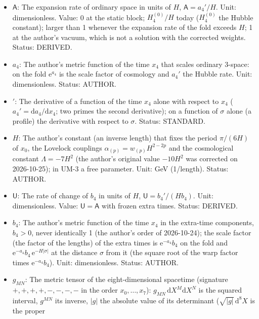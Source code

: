 \documentclass[
  10pt,
]{article}
\providecommand{\tightlist}{%
  \setlength{\itemsep}{0pt}\setlength{\parskip}{0pt}}
\begin{document}
\begin{itemize}
\tightlist
\item
  \(\mathsf{A}\): The expansion rate of ordinary space in units of
  \(H\), \(\mathsf{A} = a_4'/H\). Unit: dimensionless. Value: 0 at the
  static block; \(H_4^{(0)}/H\) today (\(H_4^{(0)}\) the Hubble
  constant); larger than 1 whenever the expansion rate of the fold
  exceeds \(H\); 1 at the author's vacuum, which is not a solution with
  the corrected weights. Status: DERIVED.
\item
  \(a_4\): The author's metric function of the time \(x_4\) that scales
  ordinary 3-space: on the fold \(\mathrm{e}^{a_4}\) is the scale factor
  of cosmology and \(a_4'\) the Hubble rate. Unit: dimensionless.
  Status: AUTHOR.
\item
  \({}'\): The derivative of a function of the time \(x_4\) alone with
  respect to \(x_4\) (\(a_4' = \mathrm{d}a_4/\mathrm{d}x_4\); two primes
  the second derivative); on a function of \(\sigma\) alone (a profile)
  the derivative with respect to \(\sigma\). Status: STANDARD.
\item
  \(H\): The author's constant (an inverse length) that fixes the period
  \(\pi/(6H)\) of \(x_0\), the Lovelock couplings
  \(\alpha_{(p)} = w_{(p)}H^{2-2p}\) and the cosmological constant
  \(\Lambda = -7H^2\) (the author's original value \(-10H^2\) was
  corrected on 2026-10-25); in UM-3 a free parameter. Unit: GeV
  (1/length). Status: AUTHOR.
\item
  \(\mathsf{U}\): The rate of change of \(b_4\) in units of \(H\),
  \(\mathsf{U} = b_4'/(Hb_4)\). Unit: dimensionless. Value:
  \(\mathsf{U} = \mathsf{A}\) with frozen extra times. Status: DERIVED.
\item
  \(b_4\): The author's metric function of the time \(x_4\) in the
  extra-time components, \(b_4 > 0\), never identically 1 (the author's
  order of 2026-10-24); the scale factor (the factor of the lengths) of
  the extra times is \(\mathrm{e}^{-a_4}b_4\) on the fold and
  \(\mathrm{e}^{-a_4}b_4\,\mathrm{e}^{-H\lvert\sigma\rvert}\) at the
  distance \(\sigma\) from it (the square root of the warp factor times
  \(\mathrm{e}^{-a_4}b_4\)). Unit: dimensionless. Status: AUTHOR.
\item
  \(g_{MN}\): The metric tensor of the eight-dimensional spacetime
  (signature \(+,+,+,+,-,-,-,-\) in the order \(x_0, \dots, x_7\)):
  \(g_{MN}\,\mathrm{d}X^M\mathrm{d}X^N\) is the squared interval,
  \(g^{MN}\) its inverse, \(\lvert g\rvert\) the absolute value of its
  determinant (\(\sqrt{\lvert g\rvert}\,\mathrm{d}^8X\) is the proper

\end{itemize}
\end{document}
